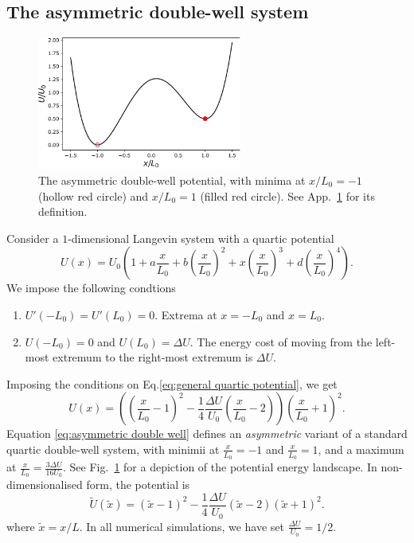 \documentclass[withindex,glossary,techreport]{cam-thesis}
\begin{document}
\begin{appendices}
\section{The asymmetric double-well system} \label{app:The asymmetric double-well system}

\begin{figure}[t]
\includegraphics[width=0.6\textwidth]{figs_part1/mcmc/1D_process_potential}
\centering \caption{The asymmetric double-well potential, with minima at $x/L_0 = -1$ (hollow red circle) and $x/L_0=1$ (filled red circle). See App.~\ref{app:The asymmetric double-well system} for its definition.}
\label{fig:1D process potential} 
\end{figure}

Consider a $1$-dimensional Langevin system with a quartic potential
\begin{equation} \label{eq:general quartic potential}
	U(x) = U_0 \left( 1 + a \frac{x}{L_0} + b \left( \frac{x}{L_0} \right)^2 + x \left( \frac{x}{L_0} \right)^3  + d \left( \frac{x}{L_0} \right)^4  \right).
\end{equation}
We impose the following condtions
\begin{enumerate}
\item $U'(-L_0) = U'(L_0) = 0$. Extrema at $x = -L_0$ and $x= L_0$.
\item $U(-L_0) = 0$ and $U(L_0) = \Delta U$. The energy cost of moving from the left-most extremum to the right-most extremum is $\Delta U$.
\end{enumerate}
Imposing the conditions on Eq.\ref{eq:general quartic potential}, we get
\begin{equation}  \label{eq:asymmetric double well}
U(x)= \left( \left(\frac{x}{L_0}-1\right)^{2}-\frac{1}{4}\frac{\Delta U}{U_{0}}\left(\frac{x}{L_0}-2\right)\right)\left(\frac{x}{L_0}+1\right)^{2}. 
\end{equation}
Equation \ref{eq:asymmetric double well} defines an \textit{asymmetric} variant of a standard quartic double-well system, with minimii at $\frac{x}{L_0}= -1$ and $\frac{x}{L_0}=1$, and a maximum at $\frac{x}{L_0} = \frac{ 3 \Delta U}{16 U_0}$. See Fig.~\ref{fig:1D process potential} for a depiction of the potential energy landscape. In non-dimensionalised form, the potential is
\begin{equation}  \label{eq:asymmetric double well}
\tilde{U}(\tilde{x})= \left( \tilde{x}-1\right)^{2} - \frac{1}{4} \frac{\Delta U}{U_{0}} \left( \tilde{x}-2 \right) \left(\tilde{x}+1\right)^{2}. 
\end{equation}
where $\tilde{x} = x / L$. In all numerical simulations, we have set $\frac{\Delta U}{U_{0}}=1/2$.


\end{appendices}
\end{document}
